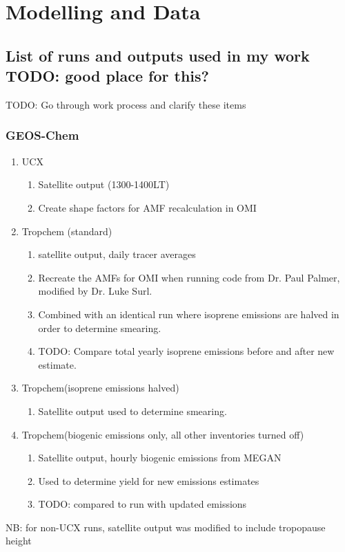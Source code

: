 
\chapter{Modelling and Data} %
\label{Model} %
\section{List of runs and outputs used in my work TODO: good place for this?}
  TODO: Go through work process and clarify these items
  \subsection{GEOS-Chem}
    \begin{enumerate}
      \item UCX 
      \begin{enumerate}
        \item Satellite output (1300-1400LT)
        \item Create shape factors for AMF recalculation in OMI
      \end{enumerate}
      
      \item Tropchem (standard)
      \begin{enumerate}
        \item satellite output, daily tracer averages
        \item Recreate the AMFs for OMI when running code from Dr. Paul Palmer, modified by Dr. Luke Surl.
        \item Combined with an identical run where isoprene emissions are halved in order to determine smearing.
        \item TODO: Compare total yearly isoprene emissions before and after new estimate.
      \end{enumerate}
    
      \item Tropchem(isoprene emissions halved)
      \begin{enumerate}
        \item Satellite output used to determine smearing.
      \end{enumerate}
    
      \item Tropchem(biogenic emissions only, all other inventories turned off)
      \begin{enumerate}
        \item Satellite output, hourly biogenic emissions from MEGAN
        \item Used to determine yield for new emissions estimates
        \item TODO: compared to run with updated emissions
      \end{enumerate}
    \end{enumerate}
    NB: for non-UCX runs, satellite output was modified to include tropopause height
